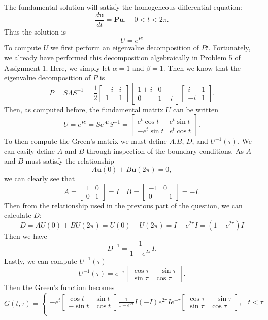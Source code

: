 \documentclass[12pt]{article}
\numberwithin{equation}{section}
\begin{document}
\begin{enumerate}
\begin{enumerate}
    The fundamental solution will satisfy the homogeneous differential equation:
    $$\frac{d\mathbf{u}}{dt}=\mathbf{Pu},\quad 0<t<2\pi.$$
    Thus the solution is
    $$U=e^{Pt}$$
    To compute $U$ we first perform an eigenvalue decomposition of $Pt$. Fortunately, we already have performed this decomposition algebraically in Problem 5 of Assignment 1. Here, we simply let $\alpha=1$ and $\beta=1$. Then we know that the eigenvalue decomposition of $P$ is
    $$P=S\Lambda S^{-1}=\frac{1}{2}\left[\begin{array}{cc}-i&i\\1&1\end{array}\right]\left[\begin{array}{cc}1+i&0\\0&1-i\end{array}\right]\left[\begin{array}{cc}i&1\\-i&1\end{array}\right].$$
    Then, as computed before, the fundamental matrix $U$ can be written
    $$U=e^{Pt}=Se^{\Lambda t}S^{-1}=\left[\begin{array}{cc}e^t\cos t&e^t \sin t\\-e^t \sin t&e^t \cos t\end{array}\right].$$
    To then compute the Green's matrix we must define $A$,$B$, $D$, and $U^{-1}(\tau)$. We can easily define $A$ and $B$ through inspection of the boundary conditions. As $A$ and $B$ must satisfy the relationship
    $$A\mathbf{u}(0)+B\mathbf{u}(2\pi)=0,$$
    we can clearly see that
    $$A=\left[\begin{array}{cc}1&0\\0&1\end{array}\right]=I\quad B=\left[\begin{array}{cc}-1&0\\0&-1\end{array}\right]=-I.$$
    Then from the relationship used in the previous part of the question, we can calculate $D$:
    $$D=AU(0)+BU(2\pi)=U(0)-U(2\pi)=I-e^{2\pi}I=(1-e^{2\pi})I$$
    Then we have
    $$D^{-1}=\frac{1}{1-e^{2\pi}}I.$$
    Lastly, we can compute $U^{-1}(\tau)$
    $$U^{-1}(\tau)=e^{-\tau}\left[\begin{array}{cc}\cos\tau&-\sin\tau\\ \sin\tau&\cos\tau\end{array}\right].$$
    Then the Green's function becomes
    $$G(t,\tau)=\left\{\begin{array}{cc}-e^t\left[\begin{array}{cc}\cos t&\sin t\\ -\sin t&\cos t\end{array}\right]\frac{1}{1-e^{2\pi}}I(-I)e^{2\pi} I e^{-\tau}\left[\begin{array}{cc}\cos\tau&-\sin\tau\\ \sin\tau&\cos\tau\end{array}\right], & t<\tau\\

\end{array}$$
\end{enumerate}
\end{enumerate}
\end{document}
